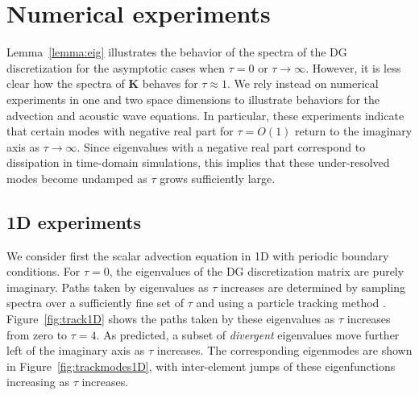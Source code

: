 \documentclass[preprint,10pt]{elsarticle}
\begin{document}
\section{Numerical experiments}

Lemma~\ref{lemma:eig} illustrates the behavior of the spectra of the DG discretization for the asymptotic cases when $\tau = 0$ or $\tau \rightarrow \infty$.  However, it is less clear how the spectra of $\bm{K}$ behaves for $\tau \approx 1$.  We rely instead on numerical experiments in one and two space dimensions to illustrate behaviors for the advection and acoustic wave equations.  In particular, these experiments indicate that certain modes with negative real part for $\tau = O(1)$ return to the imaginary axis as $\tau \rightarrow \infty$.  Since eigenvalues with a negative real part correspond to dissipation in time-domain simulations, this implies that these under-resolved modes become undamped as $\tau$ grows sufficiently large.  

\subsection{1D experiments}

We consider first the scalar advection equation in 1D with periodic boundary conditions.  For $\tau = 0$, the eigenvalues of the DG discretization matrix are purely imaginary.  Paths taken by eigenvalues as $\tau$ increases are determined by sampling spectra over a sufficiently fine set of $\tau$ and using a particle tracking method \cite{simpletracker}.  Figure~\ref{fig:track1D} shows the paths taken by these eigenvalues as $\tau$ increases from zero to $\tau = 4$.  As predicted, a subset of \emph{divergent} eigenvalues move further left of the imaginary axis as $\tau$ increases.  The corresponding eigenmodes are shown in Figure~\ref{fig:trackmodes1D}, with inter-element jumps of these eigenfunctions increasing as $\tau$ increases.  
\end{document}

